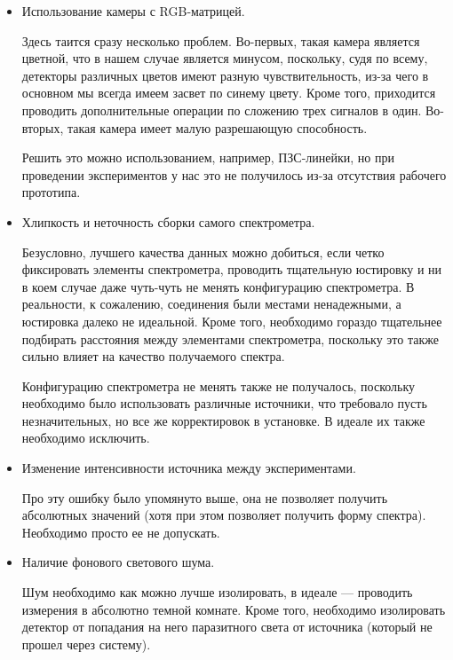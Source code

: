 \documentclass[a4paper, 12pt]{article}
\begin{document}
\begin{itemize}
	\item Использование камеры с RGB-матрицей.
	
	Здесь таится сразу несколько проблем. Во-первых, такая камера является цветной, что в нашем случае является минусом, поскольку, судя по всему, детекторы различных цветов имеют разную чувствительность, из-за чего в основном мы всегда имеем засвет по синему цвету. Кроме того, приходится проводить дополнительные операции по сложению трех сигналов в один. Во-вторых, такая камера имеет малую разрешающую способность. 
	
	Решить это можно использованием, например, ПЗС-линейки, но при проведении экспериментов у нас это не получилось из-за отсутствия рабочего прототипа.
	
	\item Хлипкость и неточность сборки самого спектрометра.
	
	Безусловно, лучшего качества данных можно добиться, если четко фиксировать элементы спектрометра, проводить тщательную юстировку и ни в коем случае даже чуть-чуть не менять конфигурацию спектрометра. В реальности, к сожалению, соединения были местами ненадежными, а юстировка далеко не идеальной. Кроме того, необходимо гораздо тщательнее подбирать расстояния между элементами спектрометра, поскольку это также сильно влияет на качество получаемого спектра.
	
	Конфигурацию спектрометра не менять также не получалось, поскольку необходимо было использовать различные источники, что требовало пусть незначительных, но все же корректировок в установке. В идеале их также необходимо исключить.
	
	\item Изменение интенсивности источника между экспериментами.
	
	Про эту ошибку было упомянуто выше, она не позволяет получить абсолютных значений (хотя при этом позволяет получить форму спектра). Необходимо просто ее не допускать.
	
	\item Наличие фонового светового шума.
	
	Шум необходимо как можно лучше изолировать, в идеале --- проводить измерения в абсолютно темной комнате. Кроме того, необходимо изолировать детектор от попадания на него паразитного света от источника (который не прошел через систему).
	
	
\end{itemize}
\end{document}

